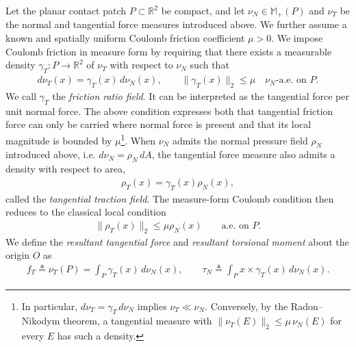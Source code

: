 \documentclass[11pt,a4paper]{article}
\theoremstyle{plain}
\begin{document}
Let the planar contact patch $P\subset\mathbb R^2$ be compact, and let $\nu_N\in\mathbb M_+(P)$ and $\nu_T$ be the normal and tangential force
measures introduced above. 
We further assume a known and spatially uniform Coulomb friction coefficient
$\mu>0$.
We impose Coulomb friction in measure form by requiring that there exists a
measurable density $\gamma_T:P\rightarrow\mathbb R^2$ of $\nu_T$ with respect
to $\nu_N$ such that
\begin{align}
\label{eq:coulomb_measure}
d\nu_T(x)=\gamma_T(x)\,d\nu_N(x),
\qquad
\|\gamma_T(x)\|_2\le\mu
\quad \nu_N\text{-a.e. on }P.
\end{align}
We call $\gamma_T$ the \textit{friction ratio field}. It can be interpreted as
the tangential force per unit normal force.
The above condition expresses both that tangential friction force can only be carried where normal force is present
and that its local magnitude is bounded by $\mu$\footnote{In particular, $d\nu_T=\gamma_T\,d\nu_N$ implies
$\nu_T\ll\nu_N$. Conversely, by the Radon--Nikodym theorem, a tangential measure with $\|\nu_T(E)\|_2\le\mu\,\nu_N(E)$ for every $E$ has such a density.}. When $\nu_N$ admits the normal pressure field $\rho_N$ introduced above, i.e. $d\nu_N=\rho_N\,dA$, the tangential force measure also admits a density with respect to area,
\begin{align}
\rho_T(x)=\gamma_T(x)\rho_N(x),
\end{align}
called the \textit{tangential traction field}. The measure-form Coulomb condition then reduces to the classical local condition
\begin{align}
\label{eq:coulomb_local}
\|\rho_T(x)\|_2\le\mu\rho_N(x)
\qquad \text{a.e. on }P.
\end{align}
We define the \textit{resultant tangential force} and \textit{resultant torsional moment} about the origin $O$ as
\begin{align}
f_T \triangleq \nu_T(P)
= \int_P\gamma_T(x)\,d\nu_N(x),
\qquad
\tau_N \triangleq
\int_P x\times\gamma_T(x)\,d\nu_N(x).
\end{align}
\end{document}
